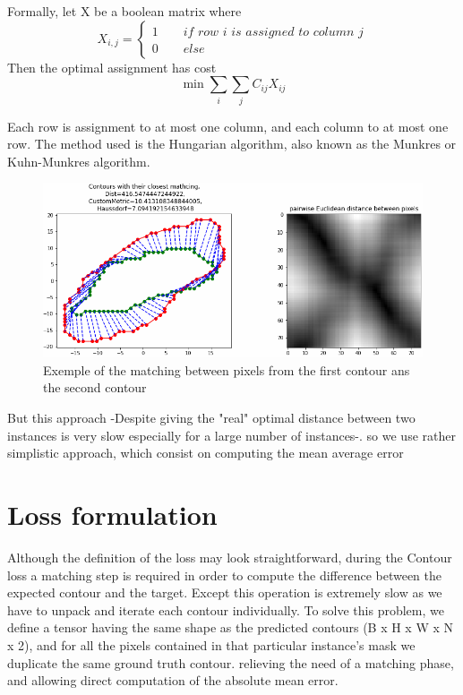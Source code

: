 \documentclass[main.tex]{subfiles}
\begin{document}
Formally, let X be a boolean matrix where 
\begin{equation}
    X_{i,j}=\left\{
                \begin{array}{ll}
                  1 \quad\quad \textit{if row i is assigned to column j}\\
                  0 \quad\quad else
                \end{array}
              \right.
\end{equation}
Then the optimal assignment has cost
\begin{equation}
    \min \sum_i \sum_j C_{ij}X_{ij}
\end{equation}

Each row is assignment to at most one column, and each column to at most one row. The method used is the Hungarian algorithm, also known as the Munkres or Kuhn-Munkres algorithm.

\begin{figure}[H]
    \centering
    \includegraphics[width=16cm]{images/contourMatching.PNG}
    \caption{Exemple of the matching between pixels from the first contour ans the second contour}
\end{figure}

But this approach -Despite giving the "real" optimal distance between two instances is very slow especially for a large number of instances-. so we use rather simplistic approach, which consist on computing the mean average error

\section{Loss formulation}
Although the definition of the loss may look straightforward, during the Contour loss a matching step is required in order to compute the difference between the expected contour and the target. Except this operation is extremely slow as we have to unpack and iterate each contour individually. To solve this problem, we define a tensor having the same shape as the predicted contours (B x H x W x N x 2), and for all the pixels contained in that particular instance's mask we duplicate the same ground truth contour. relieving the need of a matching phase, and allowing direct computation of the absolute mean error.
    
\end{document}
